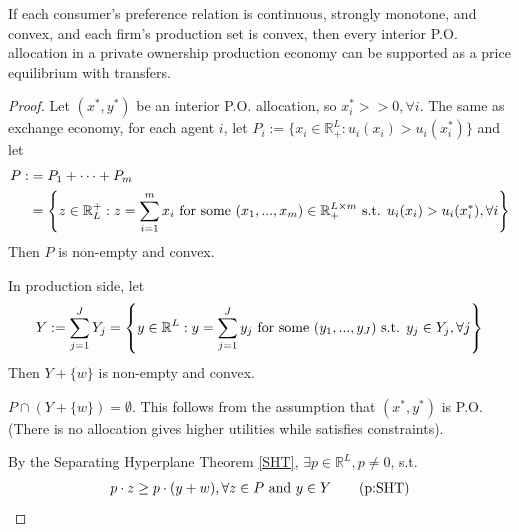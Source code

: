 \documentclass[11pt]{elegantbook}
\begin{document}
\begin{theorem}
    If each consumer's preference relation is continuous, strongly monotone, and convex, and each firm's production set is convex, then every interior P.O. allocation in a private ownership production economy can be supported as a price equilibrium with transfers.
\end{theorem}
\begin{proof}
    Let $(x^*,y^*)$ be an interior P.O. allocation, so $x_i^*>>0, \forall i$. The same as exchange economy, for each agent $i$, let $P_i:=\{x_i\in \mathbb{R}_+^L: u_i(x_i)>u_i(x_i^*)\}$ and let
    \begin{equation}
        \begin{aligned}
            P:&=P_1+\cdots+P_m\\
            &=\left\{z\in \mathbb{R}_L^+: z=\sum_{i=1}^m x_i \textnormal{ for some }(x_1,...,x_m)\in \mathbb{R}_+^{L\times m} \textnormal{ s.t. }u_i(x_i)> u_i(x_i^*), \forall i\right\}
        \end{aligned}
        \nonumber
    \end{equation}
    Then $P$ is non-empty and convex.

    In production side, let
    \begin{equation}
        \begin{aligned}
            Y:=\sum_{j=1}^JY_j=\left\{y\in \mathbb{R}^L:y=\sum_{j=1}^Jy_j \textnormal{ for some }(y_1,...,y_J) \textnormal{ s.t. }y_j\in Y_j, \forall j\right\}
        \end{aligned}
        \nonumber
    \end{equation}
    Then $Y+\{w\}$ is non-empty and convex.
    \begin{claim}
        $P\cap (Y+\{w\})=\emptyset$. This follows from the assumption that $(x^*,y^*)$ is P.O. (There is no allocation gives higher utilities while satisfies constraints).
    \end{claim}
    By the Separating Hyperplane Theorem \ref{SHT}, $\exists p\in \mathbb{R}^L, p\neq 0$, s.t.
    \begin{equation}
        \begin{aligned}
            p\cdot z\geq p\cdot(y+w), \forall z\in P \textnormal{ and } y\in Y
        \end{aligned}
        \tag{p:SHT}
        \label{SHTp}
    \end{equation}


\end{proof}
\end{document}
